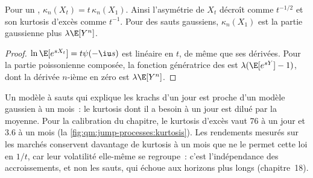 \begin{proposition}\label{prop:qm:jump-processes:scaling}
Pour un , $\kappa_n(X_t) = t\,\kappa_n(X_1)$. Ainsi l'asymétrie de $X_t$ décroît comme
$t^{-1/2}$ et son kurtosis d'excès comme $t^{-1}$. Pour des sauts gaussiens, $\kappa_n(X_1)$ est la partie
gaussienne plus $\lambda\E[Y^n]$.
\end{proposition}

\begin{proof}
$\ln\E[e^{sX_t}] = t\psi(-\iu s)$ est linéaire en $t$, de même que ses dérivées. Pour la partie
poissonienne composée, la fonction génératrice des  est $\lambda(\E[e^{sY}] - 1)$, dont la dérivée $n$-ième en zéro est
$\lambda\E[Y^n]$.
\end{proof}

Un modèle à sauts qui explique les krachs d'un jour est proche d'un modèle gaussien à un mois~: le kurtosis dont il a besoin à
un jour est dilué par la moyenne. Pour la calibration du chapitre, le kurtosis d'excès vaut 76 à un jour
et 3.6 à un mois (la \cref{fig:qm:jump-processes:kurtosis}). Les rendements mesurés sur les marchés conservent davantage
de kurtosis à un mois que ne le permet cette loi en $1/t$, car leur volatilité elle-même se regroupe~: c'est
l'indépendance des accroissements, et non les sauts, qui échoue aux horizons plus longs (chapitre~18).

